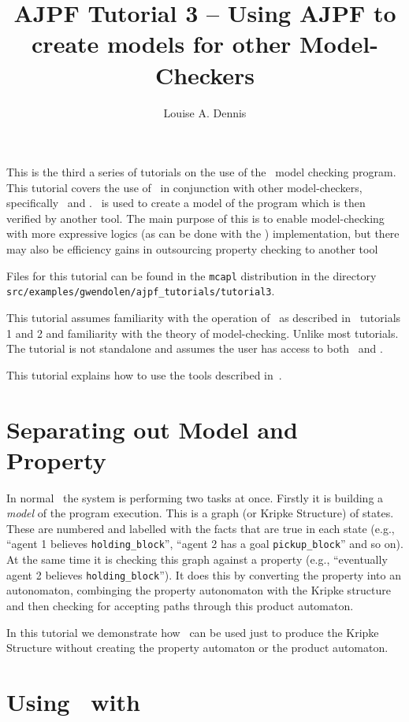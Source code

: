 \documentclass[a4]{article}
\author{Louise A. Dennis}
\title{AJPF Tutorial 3 -- Using AJPF to create models for other Model-Checkers}
\begin{document}
\maketitle
This is the third a series of tutorials on the use of the \ajpf\ model checking program.  This tutorial covers the use of \ajpf\ in conjunction with other model-checkers, specifically \spin\ and \prism.  \ajpf\ is used to create a model of the program which is then verified by another tool.  The main purpose of this is to enable model-checking with more expressive logics (as can be done with the \prism) implementation, but there may also be efficiency gains in outsourcing property checking to another tool

Files for this tutorial can be found in the \texttt{mcapl} distribution in the directory \texttt{src/examples/gwendolen/ajpf\_tutorials/tutorial3}.

This tutorial assumes familiarity with the operation of \ajpf\ as described in \ajpf\ tutorials 1 and 2 and familiarity with the theory of model-checking.  Unlike most tutorials.  The tutorial is not standalone and assumes the user has access to both \spin\ and \prism.

This tutorial explains how to use the tools described in~\cite{dennis15:two}.

\section{Separating out Model and Property}

In normal \ajpf\ the system is performing two tasks at once.  Firstly it is building a \emph{model} of the program execution.  This is a graph (or Kripke Structure) of states.  These are numbered and labelled with the facts that are true in each state (e.g., ``agent 1 believes \texttt{holding\_block}'', ``agent 2 has a goal \texttt{pickup\_block}'' and so on).  At the same time it is checking this graph against a property (e.g., ``eventually agent 2 believes \texttt{holding\_block}'').  It does this by converting the property into an autonomaton, combinging the property autonomaton with the Kripke structure and then checking for accepting paths through this product automaton.

In this tutorial we demonstrate how \ajpf\ can be used just to produce the Kripke Structure without creating the property automaton or the product automaton.

\section{Using \ajpf\ with \spin}
\end{document}
